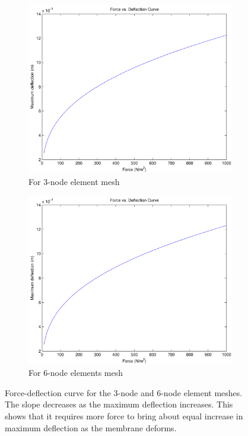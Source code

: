 \documentclass[../main.tex]{subfiles}
\begin{document}
\begin{figure}[ht]
  \centering
  \begin{subfigure}[b]{0.5\textwidth}
    \includegraphics[scale=0.5]{./img/forceDeflection.pdf}
    \caption{For 3-node element mesh}
    \label{fig:fDT3}
  \end{subfigure}%
  \begin{subfigure}[b]{0.5\textwidth}
    \includegraphics[scale=0.5]{./img/forceDeflectionT6.pdf}
    \caption{For 6-node elements mesh}
    \label{fig:fDT6}
  \end{subfigure}
  \caption{Force-deflection curve for the 3-node and 6-node element
    meshes. The slope decreases as the maximum deflection
    increases. This shows that it requires more force to bring about
    equal increase in maximum deflection as the membrane deforms.}
  \label{fig:forceDeflection}
\end{figure}
\end{document}
